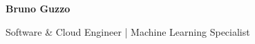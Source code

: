 \documentclass[9pt, a4paper]{article}
\begin{document}

\begin{center}
    {\Huge\bfseries Bruno Guzzo} %
    \vspace{4pt}
    \par
    {\Large Software \& Cloud Engineer | Machine Learning Specialist} %
\end{center}
\vspace{8pt}

\end{document}
